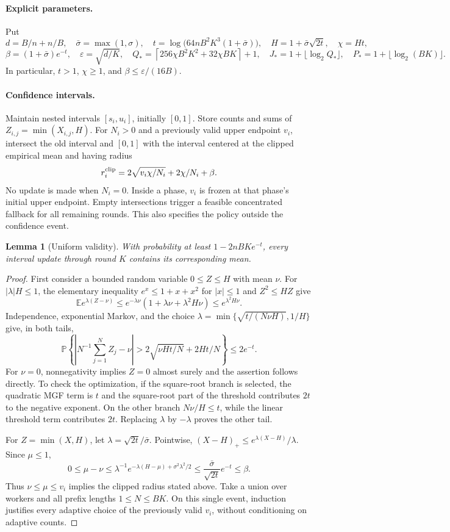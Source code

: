 \documentclass[11pt]{article}
\newtheorem{lemma}{Lemma}
\newcommand{\E}{\mathbb E}
\newcommand{\Prb}{\mathbb P}
\begin{document}
\paragraph{Explicit parameters.}
Put
\[
 d=B/n+n/B,\quad \bar\sigma=\max(1,\sigma),\quad
 t=\log\bigl(64nB^2K^3(1+\bar\sigma)\bigr),\quad
 H=1+\bar\sigma\sqrt{2t},\quad \chi=Ht,
\]
\[
 \beta=(1+\bar\sigma)e^{-t},\quad \varepsilon=\sqrt{d/K},\quad
 Q_* = \left\lceil256\chi B^2K^2+32\chi BK\right\rceil+1,\quad
 J_*=1+\lfloor\log_2 Q_*\rfloor,\quad
 P_*=1+\lfloor\log_2(BK)\rfloor.
\]
In particular, $t>1$, $\chi\ge1$, and $\beta\le\varepsilon/(16B)$.

\paragraph{Confidence intervals.}
Maintain nested intervals $[s_i,u_i]$, initially $[0,1]$. Store counts and sums of
$Z_{i,j}=\min(X_{i,j},H)$. For $N_i>0$ and a previously valid upper endpoint
$v_i$, intersect the old interval and $[0,1]$ with the interval centered at the
clipped empirical mean and having radius
\[
 r_i^{\rm clip}=2\sqrt{v_i\chi/N_i}+2\chi/N_i+\beta.
\]
No update is made when $N_i=0$. Inside a phase, $v_i$ is frozen at that phase's
initial upper endpoint. Empty intersections trigger a feasible concentrated fallback
for all remaining rounds. This also specifies the policy outside the confidence event.

\begin{lemma}[Uniform validity]
With probability at least $1-2nBK e^{-t}$, every interval update through round
$K$ contains its corresponding mean.
\end{lemma}
\begin{proof}
First consider a bounded random variable $0\le Z\le H$ with mean $\nu$.
For $|\lambda|H\le1$, the elementary inequality $e^x\le1+x+x^2$ for $|x|\le1$
and $Z^2\le HZ$ give
\[
 \E e^{\lambda(Z-\nu)}
 \le e^{-\lambda\nu}(1+\lambda\nu+\lambda^2H\nu)
 \le e^{\lambda^2H\nu}.
\]
Independence, exponential Markov, and the choice
$\lambda=\min\{\sqrt{t/(N\nu H)},1/H\}$ give, in both tails,
\[
 \Prb\left\{\left|N^{-1}\sum_{j=1}^N Z_j-\nu\right|
       >2\sqrt{\nu Ht/N}+2Ht/N\right\}\le2e^{-t}.
\]
For $\nu=0$, nonnegativity implies $Z=0$ almost surely and the assertion follows
directly. To check the optimization, if the square-root branch is selected,
the quadratic MGF term is $t$ and the square-root part of the threshold contributes
$2t$ to the negative exponent. On the other branch $N\nu/H\le t$, while the
linear threshold term contributes $2t$. Replacing $\lambda$ by $-\lambda$
proves the other tail.

For $Z=\min(X,H)$, let $\lambda=\sqrt{2t}/\bar\sigma$. Pointwise,
$(X-H)_+\le e^{\lambda(X-H)}/\lambda$. Since $\mu\le1$,
\[
 0\le\mu-\nu\le\lambda^{-1}
      e^{-\lambda(H-\mu)+\sigma^2\lambda^2/2}
 \le\frac{\bar\sigma}{\sqrt{2t}}e^{-t}\le\beta.
\]
Thus $\nu\le\mu\le v_i$ implies the clipped radius stated above.
Take a union over workers and all prefix lengths
$1\le N\le BK$. On this single event, induction justifies every adaptive
choice of the previously valid $v_i$, without conditioning on adaptive counts.
\end{proof}
\end{document}
